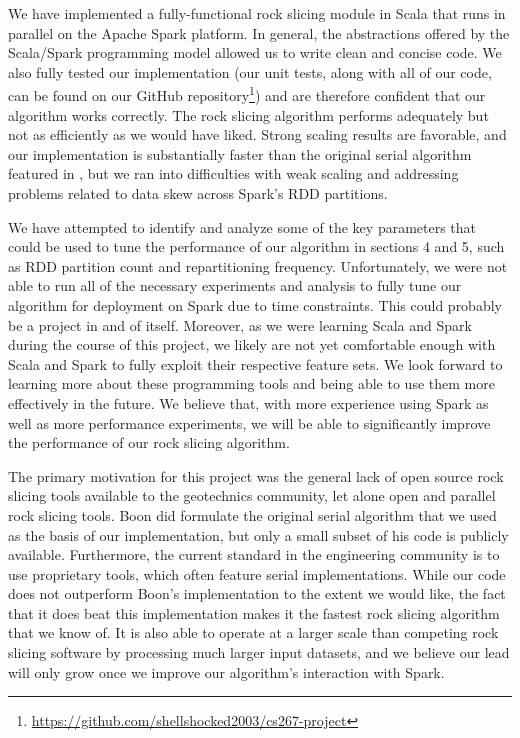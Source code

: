 We have implemented a fully-functional rock slicing module in Scala that runs in parallel on the Apache Spark platform. In general, the abstractions offered by the Scala/Spark programming model allowed us to write clean and concise code. We also fully tested our implementation (our unit tests, along with all of our code, can be found on our GitHub repository\footnote{\url{https://github.com/shellshocked2003/cs267-project}}) and are therefore confident that our algorithm works correctly. The rock slicing algorithm performs adequately but not as efficiently as we would have liked. Strong scaling results are favorable, and our implementation is substantially faster than the original serial algorithm featured in \cite{slicing}, but we ran into difficulties with weak scaling and addressing problems related to data skew across Spark's RDD partitions.

We have attempted to identify and analyze some of the key parameters that could be used to tune the performance of our algorithm in sections 4 and 5, such as RDD partition count and repartitioning frequency. Unfortunately, we were not able to run all of the necessary experiments and analysis to fully tune our algorithm for deployment on Spark due to time constraints. This could probably be a project in and of itself. Moreover, as we were learning Scala and Spark during the course of this project, we likely are not yet comfortable enough with Scala and Spark to fully exploit their respective feature sets. We look forward to learning more about these programming tools and being able to use them more effectively in the future. We believe that, with more experience using Spark as well as more performance experiments, we will be able to significantly improve the performance of our rock slicing algorithm.

The primary motivation for this project was the general lack of open source rock slicing tools available to the geotechnics community, let alone open and parallel rock slicing tools. Boon did formulate the original serial algorithm that we used as the basis of our implementation, but only a small subset of his code is publicly available. Furthermore, the current standard in the engineering community is to use proprietary tools, which often feature serial implementations. While our code does not outperform Boon's implementation to the extent we would like, the fact that it does beat this implementation makes it the fastest rock slicing algorithm that we know of. It is also able to operate at a larger scale than competing rock slicing software by processing much larger input datasets, and we believe our lead will only grow once we improve our algorithm's interaction with Spark.

